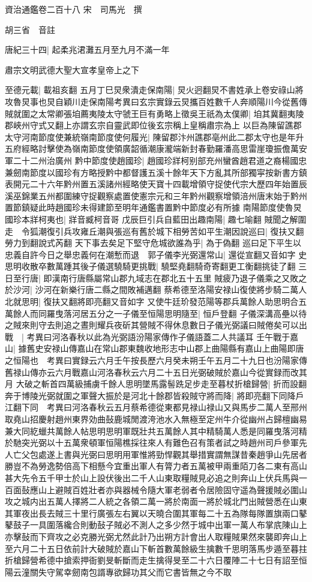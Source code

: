 資治通鑑卷二百十八
宋　司馬光　撰

胡三省　音註

唐紀三十四|{
	起柔兆涒灘五月至九月不滿一年}


肅宗文明武德大聖大宣孝皇帝上之下

至德元載|{
	載祖亥翻}
五月丁巳炅衆潰走保南陽|{
	炅火迥翻炅不書姓承上卷安祿山將攻魯炅事也炅自穎川走保南陽考異曰玄宗實錄云炅攜百姓數千人奔順陽川今從舊傳}
賊就圍之太常卿張垍薦夷陵太守虢王巨有勇略上徵吳王祇為太僕卿|{
	垍其冀翻夷陵郡峽州守式又翻上亦謂玄宗自靈武即位後玄宗稱上皇稱肅宗為上}
以巨為陳留譙郡太守河南節度使兼統嶺南節度使何履光|{
	陳留郡汴州譙郡亳州此二郡太守也是年升五府經略討擊使為嶺南節度使領廣韶循潮康瀧端新封春勤羅潘高思雷崖瓊振儋萬安軍二十二州治廣州}
黔中節度使趙國珍|{
	趙國珍牂柯别部充州蠻酋趙君道之裔楊國忠兼劒南節度以國珍有方略授黔中都督護五溪十餘年天下方亂其所部獨寜按新書方鎮表開元二十六年黔州置五溪諸州經略使天寶十四載增領守捉使代宗大歷四年始置辰溪巫錦業五州都圍練守捉觀察處置使憲宗元和三年黔州觀察增領涪州唐末始于黔州置節鎮疑此時趙國珍未得建節至明年通鑑書置黔中節度必有所據}
南陽節度使魯炅國珍本牂柯夷也|{
	牂音臧柯音哥}
戊辰巨引兵自藍田出趣南陽|{
	趣七喻翻}
賊聞之解圍走　令狐潮復引兵攻雍丘潮與張巡有舊於城下相勞苦如平生潮因說巡曰|{
	復扶又翻勞力到翻說式芮翻}
天下事去矣足下堅守危城欲誰為乎|{
	為于偽翻}
巡曰足下平生以忠義自許今日之舉忠義何在潮慙而退　郭子儀李光弼還常山|{
	還從宣翻又音如字}
史思明收散卒數萬踵其後子儀選驍騎更挑戰|{
	驍堅堯翻騎奇寄翻更工衡翻挑徒了翻}
三日至行唐|{
	即漢南行唐縣屬常山郡九域志在郡北五十五里}
賊疲乃退子儀乘之又敗之於沙河|{
	沙河在新樂行唐二縣之間敗補邁翻}
蔡希德至洛陽安禄山復使將步騎二萬人北就思明|{
	復扶又翻將即亮翻又音如字}
又使牛廷玠發范陽等郡兵萬餘人助思明合五萬餘人而同羅曳落河居五分之一子儀至恒陽思明隨至|{
	恒戶登翻}
子儀深溝高壘以待之賊來則守去則追之晝則耀兵夜斫其營賊不得休息數日子儀光弼議曰賊倦矣可以出戰　|{
	考異曰河洛春秋以此為光弼語汾陽家傳作子儀語蓋二人共議耳}
壬午戰于嘉山|{
	據舊史安禄山傳嘉山在常山郡東魏收地形志中山郡上曲陽縣有嘉山上曲陽即唐之恒陽也　考異曰實録云六月壬午按長歷六月癸未朔壬午五月二十九日也汾陽家傳舊禄山傳亦云六月戰嘉山河洛春秋云六月二十五日光弼破賊於嘉山今從實録而改其月}
大破之斬首四萬級捕虜千餘人思明墜馬露髻跣足步走至暮杖折槍歸營|{
	折而設翻}
奔于博陵光弼就圍之軍聲大振於是河北十餘郡皆殺賊守將而降|{
	將即亮翻下同降戶江翻下同　考異曰河洛春秋云五月蔡希德從東都見禄山禄山又與馬步二萬人至邢州取堯山招慶射趙州東界効曲鼔鹿城閒渡洿池水入無極至定州牛介從幽州占歸檀幽易兼大同紇蠟共萬餘人帖思明思明軍既壯共五萬餘人其中精騎萬人悉是同羅曳落河精於馳突光弼以十五萬衆頓軍恒陽樵採往來人有難色召有策者試之時趙州司戶參軍先人亡父包處遂上書與光弼曰思明用軍惟將勁悍觀其舉措實謂無謀昔秦趙爭山先居者勝豈不為勞逸勢倍高下相懸今宜重出軍人有膂力者五萬被甲兩重陌刀各二東有高山甚大先令五千甲士於山上設伏後出二千人山東取糧賊見必追之則奔山上伏兵馬與一百面鼔應山上避賊百姓壯者亦與器械令隨大軍老弱者令居險固守遥為聲援賊必圍山攻之城内出五萬人擇將二人統之各領二萬一將於南面一將於城北門出賊營悉在山東其軍夜出長去賊三十里行廣張左右翼以天曉合圍其軍每二十五為隊每隊置旗兩口鼕鼕鼓子一具圍落纔合則動鼔子賊必不測人之多少然于城中出軍一萬人布掌㡳陳山上亦擊鼔而下齊攻之必克勝光弼尤然此計乃出朔方計會出人取糧賊果然來襲即奔山上至六月二十五日依前計大破賊於嘉山下斬首數萬餘級生擒數千思明落馬步遁至暮拄折槍歸營希德中搶索押衙劉旻斬斷而走生擒得旻至二十六日覆陣二十七日有詔至恒陽云潼關失守駕幸劒南包諝專欲歸功其父而它書皆無之今不取}
